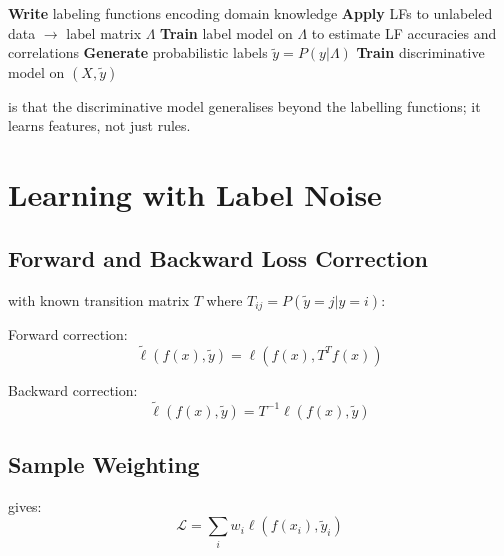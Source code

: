 \begin{algorithm}[H]
\caption{Snorkel Workflow}
\begin{algorithmic}[1]
\State \textbf{Write} labeling functions encoding domain knowledge
\State \textbf{Apply} LFs to unlabeled data $\to$ label matrix $\Lambda$
\State \textbf{Train} label model on $\Lambda$ to estimate LF accuracies and correlations
\State \textbf{Generate} probabilistic labels $\tilde{y} = P(y | \Lambda)$
\State \textbf{Train} discriminative model on $(X, \tilde{y})$
\end{algorithmic}
\end{algorithm}

 is that the discriminative model generalises beyond the labelling functions; it learns features, not just rules.


\section{Learning with Label Noise}


\subsection{Forward and Backward Loss Correction}

 with known transition matrix $T$ where $T_{ij} = P(\tilde{y} = j | y = i)$:

Forward correction:
\begin{equation}
    \tilde{\ell}(f(x), \tilde{y}) = \ell(f(x), T^T f(x))
\end{equation}

Backward correction:
\begin{equation}
    \tilde{\ell}(f(x), \tilde{y}) = T^{-1} \ell(f(x), \tilde{y})
\end{equation}

\subsection{Sample Weighting}

 gives:
\begin{equation}
    \mathcal{L} = \sum_i w_i \ell(f(x_i), \tilde{y}_i)
\end{equation}


